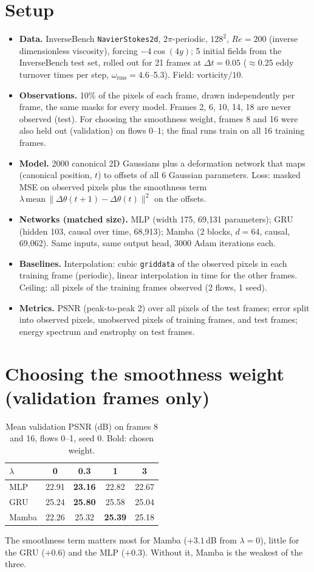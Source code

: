 \documentclass[11pt,a4paper]{article}
\begin{document}
\section{Setup}
\begin{itemize}
\item \textbf{Data.} InverseBench \texttt{NavierStokes2d}, 2$\pi$-periodic, $128^2$, $Re=200$ (inverse dimensionless
viscosity), forcing $-4\cos(4y)$; 5 initial fields from the InverseBench test set, rolled out for 21 frames at
$\Delta t=0.05$ ($\approx$0.25 eddy turnover times per step, $\omega_{\text{rms}}=4.6$--5.3). Field: vorticity$/10$.
\item \textbf{Observations.} 10\% of the pixels of each frame, drawn independently per frame, the same masks for every
model. Frames 2, 6, 10, 14, 18 are never observed (test). For choosing the smoothness weight, frames 8 and 16 were
also held out (validation) on flows 0--1; the final runs train on all 16 training frames.
\item \textbf{Model.} 2000 canonical 2D Gaussians plus a deformation network that maps (canonical position, $t$) to
offsets of all 6 Gaussian parameters. Loss: masked MSE on observed pixels plus the smoothness term
$\lambda\,\mathrm{mean}\,\lVert\Delta\theta(t{+}1)-\Delta\theta(t)\rVert^2$ on the offsets.
\item \textbf{Networks (matched size).} MLP (width 175, 69{,}131 parameters); GRU (hidden 103, causal over time,
68{,}913); Mamba (2 blocks, $d=64$, causal, 69{,}062). Same inputs, same output head, 3000 Adam iterations each.
\item \textbf{Baselines.} Interpolation: cubic \texttt{griddata} of the observed pixels in each training frame
(periodic), linear interpolation in time for the other frames. Ceiling: all pixels of the training frames observed
(2 flows, 1 seed).
\item \textbf{Metrics.} PSNR (peak-to-peak 2) over all pixels of the test frames; error split into observed pixels,
unobserved pixels of training frames, and test frames; energy spectrum and enstrophy on test frames.
\end{itemize}

\section{Choosing the smoothness weight (validation frames only)}
\begin{table}[H]
\centering
\caption{Mean validation PSNR (dB) on frames 8 and 16, flows 0--1, seed 0. Bold: chosen weight.}
\begin{tabular}{lcccc}
\toprule
$\lambda$ & 0 & 0.3 & 1 & 3 \\
\midrule
MLP   & 22.91 & \textbf{23.16} & 22.82 & 22.67 \\
GRU   & 25.24 & \textbf{25.80} & 25.58 & 25.04 \\
Mamba & 22.26 & 25.32 & \textbf{25.39} & 25.18 \\
\bottomrule
\end{tabular}
\end{table}
\noindent The smoothness term matters most for Mamba ($+3.1$\,dB from $\lambda=0$), little for the GRU ($+0.6$) and
the MLP ($+0.3$). Without it, Mamba is the weakest of the three.
\end{document}
